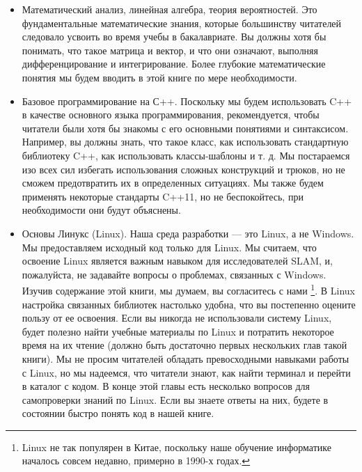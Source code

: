 \begin{Russian}
    \begin{itemize}
        \item Математический анализ, линейная алгебра, теория вероятностей. Это фундаментальные математические знания, которые большинству читателей следовало усвоить во время учебы в бакалавриате. Вы должны хотя бы понимать, что такое матрица и вектор, и что они означают, выполняя дифференцирование и интегрирование. Более глубокие математические понятия мы будем вводить в этой книге по мере необходимости.

        \item Базовое программирование на С++. Поскольку мы будем использовать C++ в качестве основного языка программирования, рекомендуется, чтобы читатели были хотя бы знакомы с его основными понятиями и синтаксисом. Например, вы должны знать, что такое класс, как использовать стандартную библиотеку C++, как использовать классы-шаблоны и т. д. Мы постараемся изо всех сил избегать использования сложных конструкций и трюков, но не сможем предотвратить их в определенных ситуациях. Мы также будем применять некоторые стандарты C++11, но не беспокойтесь, при необходимости они будут объяснены.

        \item Основы Линукс (Linux). Наша среда разработки — это Linux, а не Windows. Мы предоставляем исходный код только для Linux. Мы считаем, что освоение Linux является важным навыком для исследователей SLAM, и, пожалуйста, не задавайте вопросы о проблемах, связанных с Windows. Изучив содержание этой книги, мы думаем, вы согласитесь с нами \footnote{Linux не так популярен в Китае, поскольку наше обучение информатике началось совсем недавно, примерно в 1990-х годах.}. В Linux настройка связанных библиотек настолько удобна, что вы постепенно оцените пользу от ее освоения. Если вы никогда не использовали систему Linux, будет полезно найти учебные материалы по Linux и потратить некоторое время на их чтение (должно быть достаточно первых нескольких глав такой книги). Мы не просим читателей обладать превосходными навыками работы с Linux, но мы надеемся, что читатели знают, как найти терминал и перейти в каталог с кодом. В конце этой главы есть несколько вопросов для самопроверки знаний по Linux. Если вы знаете ответы на них, будете в состоянии быстро понять код в нашей книге.
    \end{itemize}    
\end{Russian}

